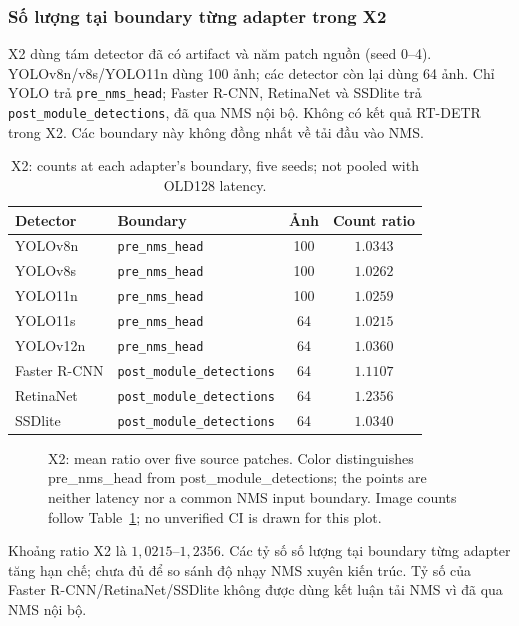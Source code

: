 \documentclass[a4paper,fleqn]{cas-dc}
\begin{document}
\subsubsection{Số lượng tại boundary từng adapter trong X2}
X2 dùng tám detector đã có artifact và năm patch nguồn (seed 0--4). YOLOv8n/v8s/YOLO11n dùng 100 ảnh; các detector còn lại dùng 64 ảnh. Chỉ YOLO trả \texttt{pre\_nms\_head}; Faster R-CNN, RetinaNet và SSDlite trả \texttt{post\_module\_\allowbreak{}detections}, đã qua NMS nội bộ. Không có kết quả RT-DETR trong X2. Các boundary này không đồng nhất về tải đầu vào NMS.
\begin{table}[t]\centering\small
\caption{X2: counts at each adapter's boundary, five seeds; not pooled with OLD128 latency.}
\begin{tabularx}{\textwidth}{@{}l X c c@{}}\toprule Detector & Boundary & Ảnh & Count ratio \\ \midrule
YOLOv8n & \texttt{pre\_nms\_head} & 100 & $1.0343$ \\
YOLOv8s & \texttt{pre\_nms\_head} & 100 & $1.0262$ \\
YOLO11n & \texttt{pre\_nms\_head} & 100 & $1.0259$ \\
YOLO11s & \texttt{pre\_nms\_head} & 64 & $1.0215$ \\
YOLOv12n & \texttt{pre\_nms\_head} & 64 & $1.0360$ \\
Faster R-CNN & \texttt{post\_module\_\allowbreak{}detections} & 64 & $1.1107$ \\
RetinaNet & \texttt{post\_module\_\allowbreak{}detections} & 64 & $1.2356$ \\
SSDlite & \texttt{post\_module\_\allowbreak{}detections} & 64 & $1.0340$ \\
\bottomrule\end{tabularx}\label{tab:x2_counts}\end{table}
\begin{figure}[t]\centering
{}
\caption{X2: mean ratio over five source patches. Color distinguishes pre\_nms\_head from post\_module\_detections; the points are neither latency nor a common NMS input boundary. Image counts follow Table~\ref{tab:x2_counts}; no unverified CI is drawn for this plot.}
\label{fig:x2_counts}\end{figure}
Khoảng ratio X2 là $1{,}0215$--$1{,}2356$. Các tỷ số số lượng tại boundary từng adapter tăng hạn chế; chưa đủ để so sánh độ nhạy NMS xuyên kiến trúc. Tỷ số của Faster R-CNN/RetinaNet/SSDlite không được dùng kết luận tải NMS vì đã qua NMS nội bộ.
\end{document}
